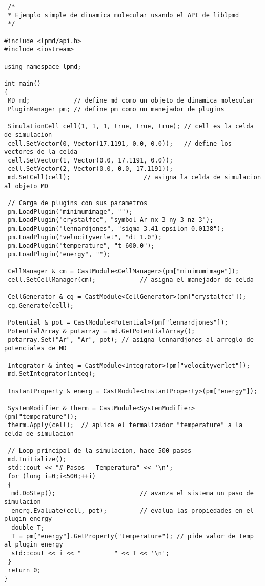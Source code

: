 \documentclass[a4paper,10pt]{scrbook}
\begin{document}
\begin{verbatim}
 /*
 * Ejemplo simple de dinamica molecular usando el API de liblpmd
 */

#include <lpmd/api.h>
#include <iostream>

using namespace lpmd;

int main()
{
 MD md;            // define md como un objeto de dinamica molecular
 PluginManager pm; // define pm como un manejador de plugins

 SimulationCell cell(1, 1, 1, true, true, true); // cell es la celda de simulacion
 cell.SetVector(0, Vector(17.1191, 0.0, 0.0));   // define los vectores de la celda
 cell.SetVector(1, Vector(0.0, 17.1191, 0.0));
 cell.SetVector(2, Vector(0.0, 0.0, 17.1191));
 md.SetCell(cell);                    // asigna la celda de simulacion al objeto MD 

 // Carga de plugins con sus parametros
 pm.LoadPlugin("minimumimage", "");
 pm.LoadPlugin("crystalfcc", "symbol Ar nx 3 ny 3 nz 3");
 pm.LoadPlugin("lennardjones", "sigma 3.41 epsilon 0.0138");
 pm.LoadPlugin("velocityverlet", "dt 1.0");
 pm.LoadPlugin("temperature", "t 600.0");
 pm.LoadPlugin("energy", "");

 CellManager & cm = CastModule<CellManager>(pm["minimumimage"]);
 cell.SetCellManager(cm);            // asigna el manejador de celda

 CellGenerator & cg = CastModule<CellGenerator>(pm["crystalfcc"]);
 cg.Generate(cell);

 Potential & pot = CastModule<Potential>(pm["lennardjones"]);
 PotentialArray & potarray = md.GetPotentialArray();
 potarray.Set("Ar", "Ar", pot); // asigna lennardjones al arreglo de potenciales de MD

 Integrator & integ = CastModule<Integrator>(pm["velocityverlet"]);
 md.SetIntegrator(integ);

 InstantProperty & energ = CastModule<InstantProperty>(pm["energy"]);
 
 SystemModifier & therm = CastModule<SystemModifier>(pm["temperature"]);
 therm.Apply(cell);  // aplica el termalizador "temperature" a la celda de simulacion

 // Loop principal de la simulacion, hace 500 pasos
 md.Initialize(); 
 std::cout << "# Pasos   Temperatura" << '\n';
 for (long i=0;i<500;++i)
 {
  md.DoStep();                       // avanza el sistema un paso de simulacion
  energ.Evaluate(cell, pot);         // evalua las propiedades en el plugin energy
  double T;
  T = pm["energy"].GetProperty("temperature"); // pide valor de temp al plugin energy
  std::cout << i << "         " << T << '\n';
 }
 return 0;
}
\end{verbatim}
\end{document}
